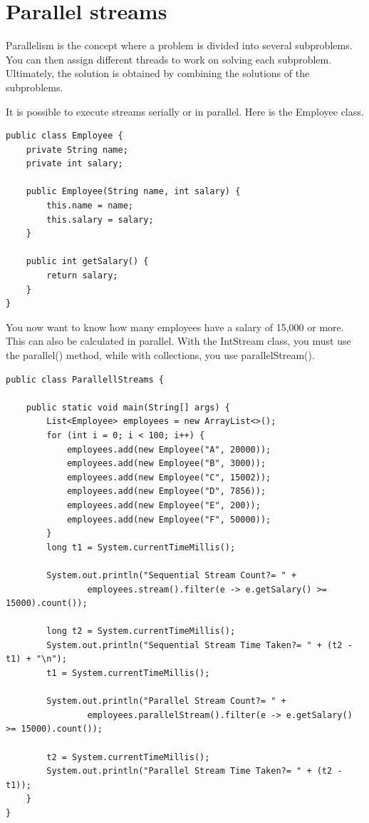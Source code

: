 \section{Parallel streams}

Parallelism is the concept where a problem is divided into several subproblems. You can then assign different threads to work on solving each subproblem. Ultimately, the solution is obtained by combining the solutions of the subproblems.

It is possible to execute streams serially or in parallel. Here is the Employee class.

\begin{lstlisting}
public class Employee {
	private String name;
	private int salary;

	public Employee(String name, int salary) {
		this.name = name;
		this.salary = salary;
	}

	public int getSalary() {
		return salary;
	}
}
\end{lstlisting}

You now want to know how many employees have a salary of 15,000 or more. This can also be calculated in parallel. With the IntStream class, you must use the parallel() method, while with collections, you use parallelStream().

\begin{lstlisting}
public class ParallellStreams {

	public static void main(String[] args) {
		List<Employee> employees = new ArrayList<>();
		for (int i = 0; i < 100; i++) {
			employees.add(new Employee("A", 20000));
			employees.add(new Employee("B", 3000));
			employees.add(new Employee("C", 15002));
			employees.add(new Employee("D", 7856));
			employees.add(new Employee("E", 200));
			employees.add(new Employee("F", 50000));
		}
		long t1 = System.currentTimeMillis();

		System.out.println("Sequential Stream Count?= " +
				employees.stream().filter(e -> e.getSalary() >= 15000).count());

		long t2 = System.currentTimeMillis();
		System.out.println("Sequential Stream Time Taken?= " + (t2 - t1) + "\n");
		t1 = System.currentTimeMillis();

		System.out.println("Parallel Stream Count?= " +
				employees.parallelStream().filter(e -> e.getSalary() >= 15000).count());

		t2 = System.currentTimeMillis();
		System.out.println("Parallel Stream Time Taken?= " + (t2 - t1));
	}
}
\end{lstlisting}


